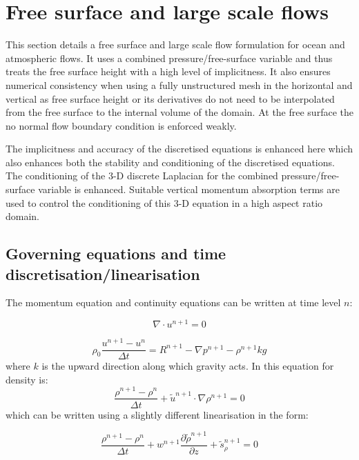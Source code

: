 \pagebreak


\section{Free surface and large scale flows}
\label{Free surface and large scale flows}


This section  details a free surface and large scale flow formulation
for ocean and atmospheric flows.
It uses a combined pressure/free-surface
variable and thus treats the free surface height with a
high level of implicitness. It also ensures numerical
consistency when using a fully unstructured mesh in the horizontal
and vertical as free surface height or its derivatives do not
need to be interpolated from the free surface to the internal volume
of the domain.
At the free surface the no normal flow boundary
condition is enforced weakly.

The implicitness and accuracy of the discretised equations is enhanced
here which also enhances both the stability and conditioning
of the discretised equations.
The conditioning of the 3-D discrete
Laplacian for the combined pressure/free-surface variable is
enhanced. Suitable vertical momentum
absorption terms are used to control the
conditioning of this 3-D equation in a high aspect ratio
domain.



\subsection{Governing equations and time discretisation/linearisation}
\noindent
The momentum equation and continuity equations can be written at
time level $n$:

\begin{equation}
\nabla \cdot u^{n+1}=0
\label{d1eqn}
\end{equation}

\begin{equation}
\rho_0 \frac{u^{n+1}- u^n}{\Delta t}= R^{n+1} - \nabla p^{n+1} - \rho^{n+1} k g
\label{ns}
\end{equation}
where $k$ is the upward direction along which gravity acts.
In this equation for density is:
\begin{equation}
\frac{\rho^{n+1} -\rho^n}{\Delta t} + {\tilde u}^{n+1}\cdot \nabla \rho^{n+1}=0
\label{d2eqn}
\end{equation}
which can be written using a slightly different linearisation in the form:

\begin{equation}
\frac{\rho^{n+1} -\rho^n}{\Delta t}
+ w^{n+1} \frac{\partial {\tilde \rho}^{n+1}}{\partial z} +  {\tilde s}_\rho^{n+1}=0
\label{d2eqn-sim}
\end{equation}

